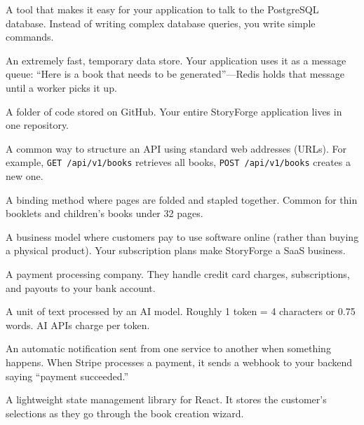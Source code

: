 \documentclass[12pt, letterpaper, oneside]{book}
\begin{document}
\begin{description}[style=nextline, leftmargin=2em, itemsep=6pt]
\item[Prisma]
A tool that makes it easy for your application to talk to the PostgreSQL database. Instead of writing complex database queries, you write simple commands.

\item[Redis]
An extremely fast, temporary data store. Your application uses it as a message queue: ``Here is a book that needs to be generated''---Redis holds that message until a worker picks it up.

\item[Repository (Repo)]
A folder of code stored on GitHub. Your entire StoryForge application lives in one repository.

\item[REST API]
A common way to structure an API using standard web addresses (URLs). For example, \texttt{GET /api/v1/books} retrieves all books, \texttt{POST /api/v1/books} creates a new one.

\item[Saddle-Stitch]
A binding method where pages are folded and stapled together. Common for thin booklets and children's books under 32 pages.

\item[SaaS (Software as a Service)]
A business model where customers pay to use software online (rather than buying a physical product). Your subscription plans make StoryForge a SaaS business.

\item[Stripe]
A payment processing company. They handle credit card charges, subscriptions, and payouts to your bank account.

\item[Token (AI)]
A unit of text processed by an AI model. Roughly 1 token = 4 characters or 0.75 words. AI APIs charge per token.

\item[Webhook]
An automatic notification sent from one service to another when something happens. When Stripe processes a payment, it sends a webhook to your backend saying ``payment succeeded.''

\item[Zustand]
A lightweight state management library for React. It stores the customer's selections as they go through the book creation wizard.

\end{description}

\end{document}

